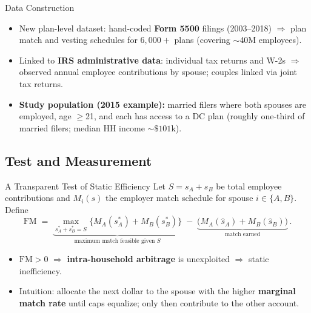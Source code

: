 \documentclass[11pt,notes=hide,aspectratio=169,mathserif]{beamer}
\begin{document}
\begin{frame}{Data Construction}
\small
\begin{itemize}
  \item New plan-level dataset: hand-coded \textbf{Form 5500} filings (2003--2018) $\Rightarrow$ plan match and vesting schedules for $6{,}000+$ plans (covering $\sim$40M employees).
  \item Linked to \textbf{IRS administrative data}: individual tax returns and W-2s $\Rightarrow$ observed annual employee contributions by spouse; couples linked via joint tax returns.
  \item \textbf{Study population (2015 example):} married filers where both spouses are employed, age $\ge$21, and each has access to a DC plan (roughly one-third of married filers; median HH income $\sim\$101$k).
\end{itemize}
\end{frame}

\subsection{Test and Measurement}

\begin{frame}{A Transparent Test of Static Efficiency}
\small
Let $S=s_A+s_B$ be total employee contributions and $M_i(s)$ the employer match schedule for spouse $i\in\{A,B\}$. Define
\begin{equation*}
\mathrm{FM} \;=\; \underbrace{\max_{s^*_A+s^*_B=S}\{M_A(s^*_A)+M_B(s^*_B)\}}_{\text{maximum match feasible given $S$}} \;-\; \underbrace{ \big(M_A(\hat s_A)+M_B(\hat s_B)\big) }_{\text{match earned}}\,.
\end{equation*}
\begin{itemize}
  \item $\mathrm{FM}>0$ $\Rightarrow$ \textbf{intra-household arbitrage} is unexploited $\Rightarrow$ static inefficiency.
  \item Intuition: allocate the next dollar to the spouse with the higher \textbf{marginal match rate} until caps equalize; only then contribute to the other account.
\end{itemize}
\end{frame}
\end{document}
